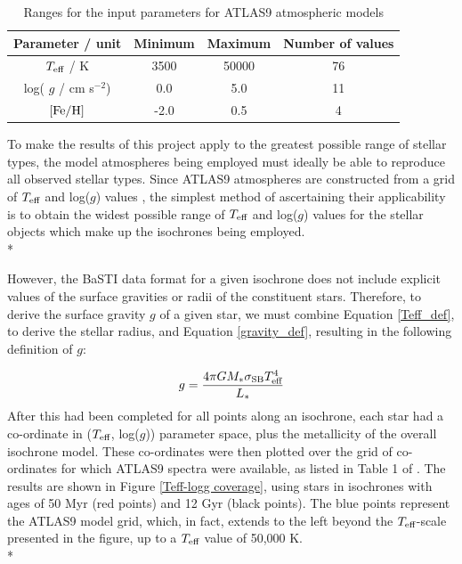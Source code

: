 \documentclass[12pt, a4paper]{report}
\begin{document}
\begin{table}
\begin{center}
\begin{tabular}{cccc}
\hline
Parameter / unit & Minimum & Maximum & Number of values \\
\hline
$T_{\textnormal{eff}}$ / K & 3500 & 50000 & 76 \\
log( $g$ / cm s$^{-2}$) & 0.0 & 5.0 & 11 \\
$\textnormal{[Fe/H]}$ & -2.0 & 0.5 & 4 \\
\hline
\end{tabular}
\caption{Ranges for the input parameters for ATLAS9 atmospheric models}
\label{atlas9_input}
\end{center}
\end{table}

To make the results of this project apply to the greatest possible range of stellar types, the model atmospheres being employed must ideally be able to reproduce all observed stellar types. Since ATLAS9 atmospheres are constructed from a grid of $T_{\textnormal{eff}}$ and log($g$) values \citep{2004astro.ph..5087C}, the simplest method of ascertaining their applicability is to obtain the widest possible range of $T_{\textnormal{eff}}$ and log($g$) values for the stellar objects which make up the isochrones being employed.\\*

However, the BaSTI data format for a given isochrone does not include explicit values of the surface gravities or radii of the constituent stars. Therefore, to derive the surface gravity $g$ of a given star, we must combine Equation \ref{Teff_def}, to derive the stellar radius, and Equation \ref{gravity_def}, resulting in the following definition of $g$:

\begin{equation}
\label{gravity_LT_calc}
g = \frac{4 \pi G M_{*} \sigma_{\textnormal{SB}} T_{\textnormal{eff}}^{4}}{L_{*}}
\end{equation}
After this had been completed for all points along an isochrone, each star had a co-ordinate in ($T_{\textnormal{eff}}$, log($g$)) parameter space, plus the metallicity of the overall isochrone model. These co-ordinates were then plotted over the grid of co-ordinates for which ATLAS9 spectra were available, as listed in Table 1 of \cite{2004astro.ph..5087C}. The results are shown in Figure \ref{Teff-logg coverage}, using stars in isochrones with ages of 50 Myr (red points) and 12 Gyr (black points). The blue points represent the ATLAS9 model grid, which, in fact, extends to the left beyond the $T_{\textnormal{eff}}$-scale presented in the figure, up to a $T_{\textnormal{eff}}$ value of 50,000 K.\\*
\end{document}
